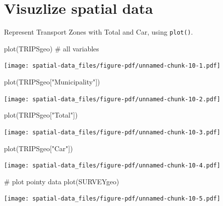 \documentclass[
  letterpaper,
  DIV=11,
  numbers=noendperiod]{scrreprt}
\newenvironment{Shaded}{\begin{snugshade}}{\end{snugshade}}
\newcommand{\CommentTok}[1]{\textcolor[rgb]{0.37,0.37,0.37}{#1}}
\newcommand{\FunctionTok}[1]{\textcolor[rgb]{0.28,0.35,0.67}{#1}}
\newcommand{\NormalTok}[1]{\textcolor[rgb]{0.00,0.23,0.31}{#1}}
\newcommand{\StringTok}[1]{\textcolor[rgb]{0.13,0.47,0.30}{#1}}
\begin{document}
\section{Visuzlize spatial data}\label{visuzlize-spatial-data}

Represent Transport Zones with Total and Car, using \texttt{plot()}.

\begin{Shaded}
\begin{Highlighting}[]
\FunctionTok{plot}\NormalTok{(TRIPSgeo) }\CommentTok{\# all variables}
\end{Highlighting}
\end{Shaded}

\texttt{[image: spatial-data\_files/figure-pdf/unnamed-chunk-10-1.pdf]}

\begin{Shaded}
\begin{Highlighting}[]
\FunctionTok{plot}\NormalTok{(TRIPSgeo[}\StringTok{"Municipality"}\NormalTok{])}
\end{Highlighting}
\end{Shaded}

\texttt{[image: spatial-data\_files/figure-pdf/unnamed-chunk-10-2.pdf]}

\begin{Shaded}
\begin{Highlighting}[]
\FunctionTok{plot}\NormalTok{(TRIPSgeo[}\StringTok{"Total"}\NormalTok{])}
\end{Highlighting}
\end{Shaded}

\texttt{[image: spatial-data\_files/figure-pdf/unnamed-chunk-10-3.pdf]}

\begin{Shaded}
\begin{Highlighting}[]
\FunctionTok{plot}\NormalTok{(TRIPSgeo[}\StringTok{"Car"}\NormalTok{])}
\end{Highlighting}
\end{Shaded}

\texttt{[image: spatial-data\_files/figure-pdf/unnamed-chunk-10-4.pdf]}

\begin{Shaded}
\begin{Highlighting}[]
\CommentTok{\# plot pointy data}
\FunctionTok{plot}\NormalTok{(SURVEYgeo)}
\end{Highlighting}
\end{Shaded}

\texttt{[image: spatial-data\_files/figure-pdf/unnamed-chunk-10-5.pdf]}
\end{document}
